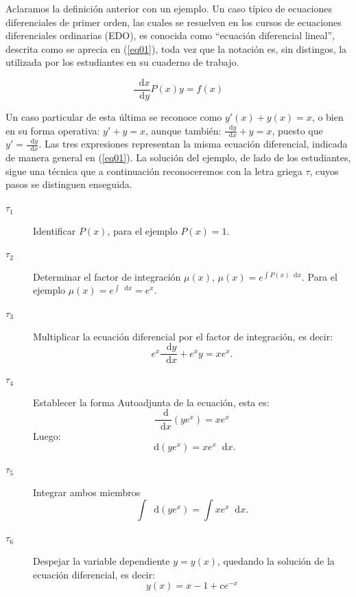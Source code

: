 \documentclass[spanish]{textolivre}
\newcommand*\diff{\mathop{}\!\mathrm{d}}
\begin{document}
Aclaramos la definición anterior con un ejemplo. Un caso típico de ecuaciones diferenciales de primer orden, las cuales se resuelven en los cursos de ecuaciones diferenciales ordinarias (EDO), es conocida como “ecuación diferencial lineal”, descrita como se aprecia en (\ref{eq01}), toda vez que la notación es, sin distingos, la utilizada por los estudiantes en su cuaderno de trabajo. 

\begin{equation}\label{eq01}
\frac{\diff x}{\diff y} P(x) y = f(x)
\end{equation}

Un caso particular de esta última se reconoce como $y'(x)+y(x)=x$, o bien en su forma operativa: $y'+y=x$, aunque también: $\frac{\diff y}{\diff x}+ y=x$, puesto que $y'=\frac{\diff y}{\diff x}$. Las tres expresiones representan la misma ecuación diferencial, indicada de manera general en (\ref{eq01}). La solución del ejemplo, de lado de los estudiantes, sigue una técnica que a continuación reconoceremos con la letra griega $\tau$, cuyos pasos se distinguen enseguida.

\begin{description}
\item[$\tau_1$] Identificar $P(x)$, para el ejemplo $P(x)=1$.

\item[$\tau_2$] Determinar el factor de integración $\mu(x)$, $\mu(x) = e^{\int P(x) \diff x}$. Para el ejemplo $\mu(x) = e^{\int \diff x} = e^x$.

\item[$\tau_3$] Multiplicar la ecuación diferencial por el factor de integración, es decir:
\begin{equation*}
e^x\frac{\diff y}{\diff x} + e^x y = x e^x.
\end{equation*}

\item[$\tau_4$] Establecer la forma Autoadjunta de la ecuación, esta es:
\begin{equation*}
\frac{\diff }{\diff x} \left( y e^x \right) = x e^x
\end{equation*}
Luego:
\begin{equation*}
\diff \left( y e^x \right) = x e^x \diff x.
\end{equation*}

\item[$\tau_5$] Integrar ambos miembros
\begin{equation*}
\int \diff \left( y e^x \right) = \int x e^x \diff x.
\end{equation*}
\item[$\tau_6$] Despejar la variable dependiente $y = y(x)$, quedando la solución de la ecuación diferencial, es decir:
\begin{equation}
y(x) = x−1+ce^{−x}
\end{equation}
\end{description}
\end{document}
